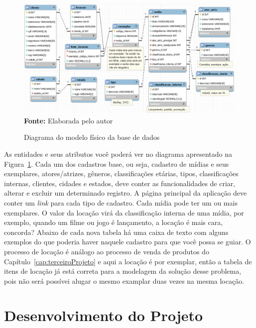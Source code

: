 \FloatBarrier
\begin{figure}[!htbp]
    \centering
    \caption{Diagrama do modelo físico da base de dados}
    \includegraphics[scale=0.45]{imagens/cap09ModeloFisico}
    \\\textbf{Fonte:} Elaborada pelo autor
    \label{fig:cap09ModeloFisico}
\end{figure}
\FloatBarrier

As entidades e seus atributos você poderá ver no diagrama apresentado na Figura~\ref{fig:cap09ModeloFisico}. Cada um dos cadastros base, ou seja, cadastro de mídias e seus exemplares, atores/atrizes, gêneros, classificações etárias, tipos, classificações internas, clientes, cidades e estados, deve conter as funcionalidades de criar, alterar e excluir um determinado registro. A página principal da aplicação deve conter um \textit{link} para cada tipo de cadastro. Cada mídia pode ter um ou mais exemplares. O valor da locação virá da classificação interna de uma mídia, por exemplo, quando um filme ou jogo é lançamento, a locação é mais cara, concorda? Abaixo de cada nova tabela há uma caixa de texto com alguns exemplos do que poderia haver naquele cadastro para que você possa se guiar. O processo de locação é análogo ao processo de venda de produtos do Capítulo~\ref{cap:terceiroProjeto} e aqui a locação é por exemplar, então a tabela de itens de locação já está correta para a modelagem da solução desse problema, pois não será possívei alugar o mesmo examplar duas vezes na mesma locação.


\section{Desenvolvimento do Projeto}

